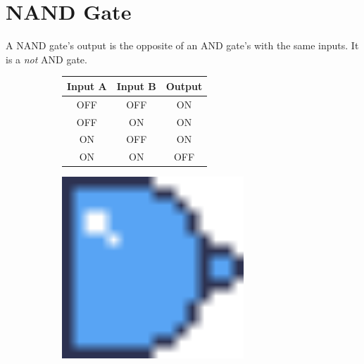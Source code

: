 \documentclass[12pt]{book}
\newcommand{\ON}{\textcolor{on}{ON}}
\newcommand{\OFF}{\textcolor{off}{OFF}}
\begin{document}
		\section{NAND Gate}
			A NAND gate's output is the opposite of an AND gate's with the same inputs. It is a \emph{not} AND gate.
			\begin{figure}[h]
				\centering
				\begin{subfigure}{0.75\textwidth}
					\begin{tabular}{|c|c|c|}
						\hline
						\textbf{Input A} & \textbf{Input B} & \textbf{Output}\\\hline
						\OFF & \OFF & \ON\\\hline
						\OFF & \ON & \ON\\\hline
						\ON & \OFF & \ON\\\hline
						\ON & \ON & \OFF\\\hline
					\end{tabular}
				\end{subfigure}
				\begin{subfigure}{0.2\textwidth}
					\centering
					\includegraphics[width=0.75\textwidth]{NAND}
				\end{subfigure}
			\end{figure}
\end{document}
